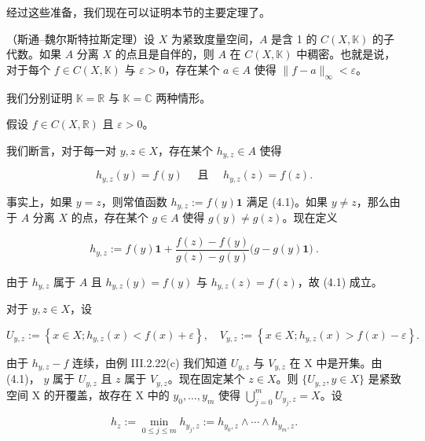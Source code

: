 经过这些准备，我们现在可以证明本节的主要定理了。

\begin{theorem}

（斯通–魏尔斯特拉斯定理）设 $X$ 为紧致度量空间，$A$ 是含 1 的 $C(X, \mathbb{K})$ 的子代数。如果 $A$ 分离 $X$ 的点且是自伴的，则 $A$ 在 $C(X, \mathbb{K})$ 中稠密。也就是说，对于每个 $f \in C(X, \mathbb{K})$ 与 $\varepsilon > 0$，存在某个 $a \in A$ 使得 $\|f - a\|_\infty < \varepsilon$。

\proofhead
我们分别证明  $ \mathbb{K} = \mathbb{R} $ 与  $ \mathbb{K} = \mathbb{C} $ 两种情形。

\begin{items}
\item

假设  $ f \in C(X, \mathbb{R}) $ 且  $ \varepsilon > 0 $。

\begin{subitems}
\item

我们断言，对于每一对  $ y, z \in X $，存在某个  $ h_{y,z} \in A $ 使得

\begin{equation}
h_{y,z}(y)=f(y)\quad\text{ 且 }\quad h_{y,z}(z)=f(z).
\end{equation}

事实上，如果 $y = z$，则常值函数 $h_{y,z} := f(y)\mathbf{1}$ 满足 (4.1)。如果 $y \neq z$，那么由于 $A$ 分离 $X$ 的点，存在某个 $g \in A$ 使得 $g(y) \neq g(z)$。现在定义

\[
h_{y,z}:=f(y)\mathbf{1}+\frac{f(z)-f(y)}{g(z)-g(y)}\big(g-g(y)\mathbf{1}\big)~.
\]

由于 $h_{y,z}$ 属于 $A$ 且 $h_{y,z}(y)=f(y)$ 与 $h_{y,z}(z)=f(z)$，故 (4.1) 成立。

\item

对于  $ y, z \in X $，设

\[
U_{y,z}:=\left\{x\in X;h_{y,z}(x)<f(x)+\varepsilon\right\},\quad V_{y,z}:=\left\{x\in X;h_{y,z}(x)>f(x)-\varepsilon\right\}.
\]

由于  $ h_{y,z} - f $ 连续，由例 III.2.22(c) 我们知道  $ U_{y,z} $ 与  $ V_{y,z} $ 在 X 中是开集。由 (4.1)， $ y $ 属于  $ U_{y,z} $ 且  $ z $ 属于  $ V_{y,z} $。现在固定某个  $ z \in X $。则  $ \{U_{y,z}, y \in X\} $ 是紧致空间 X 的开覆盖，故存在 X 中的  $ y_0, \ldots, y_m $ 使得  $ \bigcup_{j=0}^m U_{y_j,z} = X $。设

\[
h_{z}:=\min_{0\leq j\leq m}h_{y_{j},z}:=h_{y_{0},z}\wedge\cdots\wedge h_{y_{m},z}.
\]


\end{subitems}
\end{items}
\end{theorem}
